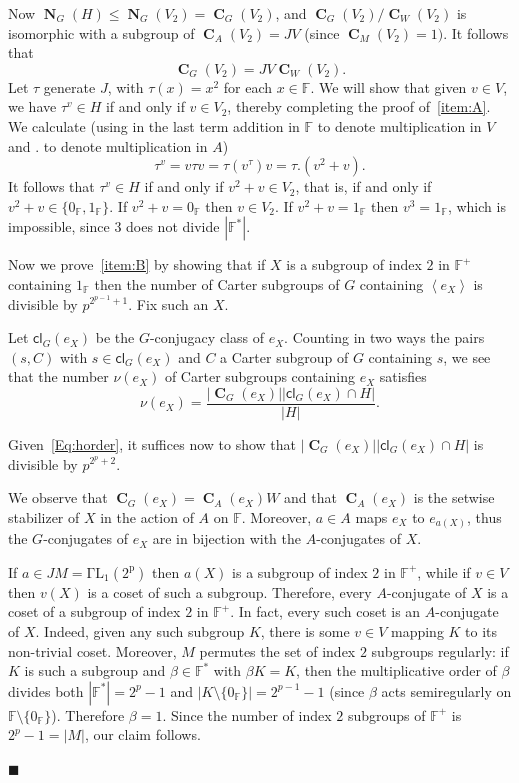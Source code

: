 \documentclass[a4paper,12pt,reqno]{amsart}
\numberwithin{equation}{section}
\DeclareMathOperator{\N}{\mathbf{N}}
\DeclareMathOperator{\cent}{\mathbf{C}}
\newcommand{\gensub}[1]{\left\langle{#1}\right\rangle}
\newcommand{\card}[1]{\left\lvert{#1}\right\rvert}
\renewcommand{\leq}{\leqslant}
\newenvironment{proofof}{{\bf {Proof.} }}{\hfill $\blacksquare$ \\}
\def\ff{{\mathbb F}}
\def\cl{{\mathsf{c}\mathsf{l}}}
\begin{document}
\begin{proofof}
Now $\N_G(H) \leq \N_G(V_2) = \cent_G(V_2)$, 
and $\cent_G(V_2)/\cent_W(V_2)$ is isomorphic with a subgroup of $\cent_A(V_2) = JV$ (since $\cent_M(V_2) = 1)$.  
It follows that
\[
\cent_G(V_2) = JV\cent_W(V_2).
\]
Let $\tau$ generate $J$, with $\tau(x) = x^2$ for each $x \in \ff$.  
We will show that given $v \in V$, 
we have $\tau^v \in H$ if and only if $v \in V_2$, 
thereby completing the proof of~\ref{item:A}.  
We calculate 
(using in the last term addition in $\ff$ to denote multiplication in $V$ 
and $.$ to denote multiplication in $A$)
\[
\tau^v = v \tau v = \tau(v^\tau)v  =\tau.(v^2+v).
\]
It follows that $\tau^v \in H$ if and only if $v^2+v \in V_2$, 
that is, if and only if $v^2+v \in \{0_\ff,1_\ff\}$.  
If $v^2+v=0_\ff$ then $v \in V_2$.  
If $v^2+v=1_\ff$ then $v^3=1_\ff$, 
which is impossible, since $3$ does not divide $\card{\ff^\ast}$.

Now we prove~\ref{item:B} by showing that if $X$ is a subgroup of index $2$ in $\ff^+$ containing $1_\ff$ 
then the number of Carter subgroups of $G$ containing 
$\gensub{e_X}$ is divisible by $p^{2^{p-1}+1}$.  
Fix such an $X$.

Let $\cl_G(e_X)$ be the $G$-conjugacy class of $e_X$.  
Counting in two ways the pairs $(s,C)$ with $s \in \cl_G(e_X)$  
and $C$ a Carter subgroup of $G$ containing $s$, 
we see that the number $\nu(e_X)$ of Carter subgroups containing $e_X$ satisfies
\begin{equation}\label{pairs}
\nu(e_X) = \frac{\card{\cent_G(e_X)} \card{\cl_G(e_X) \cap H}}{|H|}.
\end{equation}

Given~\eqref{Eq:horder}, 
it suffices now to show that $\card{\cent_G(e_X)} \card{\cl_G(e_X) \cap H}$ is divisible by $p^{2^p+2}$.

We observe that $\cent_G(e_X) = \cent_A(e_X) W$ 
and that $\cent_A(e_X)$ is the setwise stabilizer of $X$ in the action of $A$ on $\ff$.  
Moreover, $a \in A$ maps $e_X$ to $e_{a(X)}$, 
thus the $G$-conjugates of $e_X$ are in bijection with the $A$-conjugates of $X$. 

If $a \in JM = \mathrm{\Gamma L_1(2^p)}$ then $a(X)$ is a subgroup of index $2$ in $\ff^+$, 
while if $v \in V$ then $v(X)$ is a coset of such a subgroup.  
Therefore, every $A$-conjugate of $X$ is a coset of a subgroup of index $2$ in $\ff^+$.  
In fact, every such coset is an $A$-conjugate of $X$.  
Indeed, given any such subgroup $K$, there is some $v \in V$ mapping $K$ to its non-trivial coset.  
Moreover, $M$ permutes the set of index $2$ subgroups regularly: 
if $K$ is such a subgroup and $\beta \in \ff^\ast$ with $\beta K = K$, 
then the multiplicative order of $\beta$ divides both $\card{\ff^\ast} = 2^p-1$ and $\card{K \setminus \{0_\ff\}} = 2^{p-1}-1$ 
(since $\beta$ acts semiregularly on $\ff \setminus \{0_\ff\}$).  
Therefore $\beta = 1$.  
Since the number of index $2$ subgroups of $\ff^+$ is $2^p-1 = |M|$, 
our claim follows.


\end{proofof}
\end{document}
